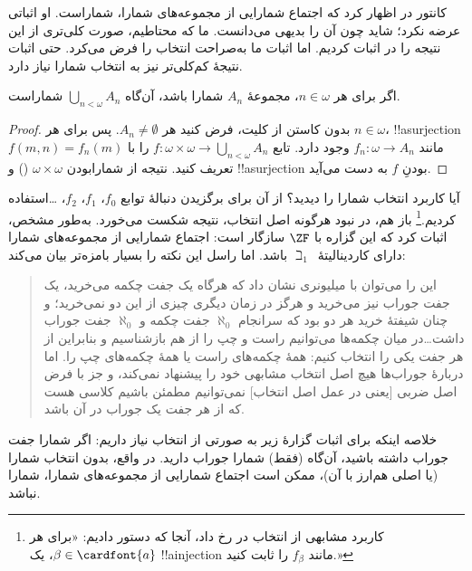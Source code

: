 \documentclass[../../../include/open-logic-section]{subfiles}
\begin{document}
\begin{ex}
کانتور در \citeyear{Cantor1878} اظهار کرد که اجتماع شمارایی از
مجموعه‌های شمارا، شماراست. او اثباتی عرضه نکرد؛ شاید چون آن را بدیهی
می‌دانست. ما که محتاطیم، صورت کلی‌تری از این نتیجه را در
 اثبات کردیم. اما
اثبات ما به‌صراحت انتخاب را فرض می‌کرد. حتی اثبات نتیجهٔ کم‌کلی‌تر
نیز به انتخاب شمارا نیاز دارد.

\begin{thm}
اگر برای هر $n \in \omega$، مجموعهٔ $A_n$ شمارا باشد، آن‌گاه
$\bigcup_{n < \omega} A_n$ شماراست.
\end{thm}

\begin{proof}
بدون کاستن از کلیت، فرض کنید هر $A_n \neq \emptyset$. پس برای هر
$n \in \omega$، !!a{surjection} مانند
$f_n \colon \omega \to A_n$ وجود دارد. تابع
$f \colon \omega \times \omega \to \bigcup_{n < \omega} A_n$ را با
$f(m, n) = f_n(m)$ تعریف کنید. نتیجه از شمارابودن
$\omega \times \omega$
() و !!a{surjection}
بودنِ $f$ به دست می‌آید.
\end{proof}
\noindent
آیا کاربرد انتخاب شمارا را دیدید؟ از آن برای برگزیدن دنبالهٔ توابع
$f_0$، $f_1$، $f_2$، \dots استفاده کردیم.\footnote{کاربرد مشابهی
از انتخاب در  رخ
داد، آنجا که دستور دادیم: «برای هر
$\beta \in \cardfont{a}$، یک !!a{injection} مانند
$f_\beta$ را ثابت کنید.»} باز هم، در نبود هرگونه اصل انتخاب، نتیجه
شکست می‌خورد. به‌طور مشخص، \citet{FefermanLevy1963} اثبات کرد که
این گزاره با $\ZF$ سازگار است: اجتماع شمارایی از مجموعه‌های شمارا
دارای کاردینالیتهٔ~$\beth_1$ باشد. اما راسل این نکته را بسیار
بامزه‌تر بیان می‌کند:
\begin{quote}
  این را می‌توان با میلیونری نشان داد که هرگاه یک جفت چکمه می‌خرید،
  یک جفت جوراب نیز می‌خرید و هرگز در زمان دیگری چیزی از این دو
  نمی‌خرید؛ و چنان شیفتهٔ خرید هر دو بود که سرانجام
  $\aleph_0$ جفت چکمه و $\aleph_0$ جفت جوراب داشت\dots\@ در میان
  چکمه‌ها می‌توانیم راست و چپ را از هم بازشناسیم و بنابراین از هر
  جفت یکی را انتخاب کنیم: همهٔ چکمه‌های راست یا همهٔ چکمه‌های چپ را.
  اما دربارهٔ جوراب‌ها هیچ اصل انتخاب مشابهی خود را پیشنهاد نمی‌کند،
  و جز با فرض اصل ضربی [یعنی در عمل اصل انتخاب] نمی‌توانیم مطمئن
  باشیم کلاسی هست که از هر جفت یک جوراب در آن باشد.
  \citep[p.~126]{Russell1919}
\end{quote}
خلاصه اینکه برای اثبات گزارهٔ زیر به صورتی از انتخاب نیاز داریم:
اگر شمارا جفت جوراب داشته باشید، آن‌گاه (فقط) شمارا جوراب دارید.
در واقع، بدون انتخاب شمارا (یا اصلی هم‌ارز با آن)، ممکن است اجتماع
شمارایی از مجموعه‌های شمارا، شمارا نباشد.
\end{ex}
\end{document}
